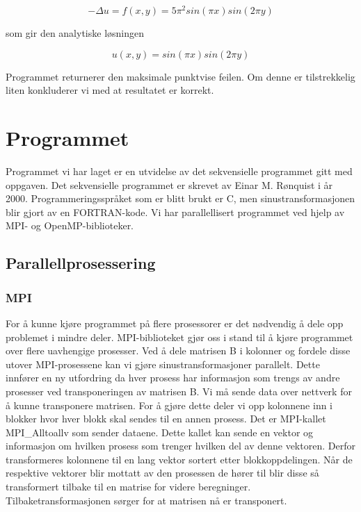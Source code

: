 \documentclass[11pt,norsk,a4paper]{article}
\begin{document}
$$ -\Delta u = f(x,y) = 5\pi^2sin(\pi x)sin(2\pi y) $$

som gir den analytiske løsningen

$$ u(x,y) = sin(\pi x)sin(2\pi y) $$

Programmet returnerer den maksimale punktvise feilen. Om denne er tilstrekkelig liten konkluderer vi med at resultatet er korrekt.


\section{Programmet}
Programmet vi har laget er en utvidelse av det sekvensielle programmet gitt med oppgaven. Det sekvensielle programmet er skrevet av Einar M. Rønquist i år 2000. Programmeringsspråket som er blitt brukt er C, men sinustransformasjonen blir gjort av en FORTRAN-kode. Vi har parallellisert programmet ved hjelp av MPI- og OpenMP-biblioteker.

\subsection{Parallellprosessering}

\subsubsection{MPI}
For å kunne kjøre programmet på flere prosessorer er det nødvendig å dele opp problemet i mindre deler. MPI-biblioteket\cite{MPI} gjør oss i stand til å kjøre programmet over flere uavhengige prosesser. Ved å dele matrisen B i kolonner og fordele disse utover MPI-prosessene kan vi gjøre sinustransformasjoner parallelt. Dette innfører en ny utfordring da hver prosess har informasjon som trengs av andre prosesser ved transponeringen av matrisen B. Vi må sende data over nettverk for å kunne transponere matrisen. For å gjøre dette deler vi opp kolonnene inn i blokker hvor hver blokk skal sendes til en annen prosess. Det er MPI-kallet MPI\_Alltoallv som sender dataene. Dette kallet kan sende en vektor og informasjon om hvilken prosess som trenger hvilken del av denne vektoren. Derfor transformeres kolonnene til en lang vektor sortert etter blokkoppdelingen. Når de respektive vektorer blir mottatt av den prosessen de hører til blir disse så transformert tilbake til en matrise for videre beregninger. Tilbaketransformasjonen sørger for at matrisen nå er transponert.
\end{document}
